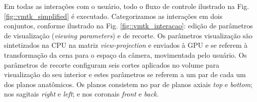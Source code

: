 \begin{figure}[ht]
 \end{figure}
 
 Em todas as interações com o usuário, todo o fluxo de controle ilustrado na Fig. \ref{fig::vmtk_simplified} é executado. Categorizamos as interações em dois conjuntos, conforme ilustrado na Fig. \ref{fig::vmtk_interacao}: edição de parâmetros de visualização (\textit{viewing parameters}) e de recorte. Os parâmetros visualização são sintetizados na CPU na matriz \textit{view-projection} e enviados à GPU e se referem à transformação da cena para o espaço da câmera, movimentada pelo usuário. Os parâmetros de recorte configuram seis cortes aplicados no volume para visualização do seu interior e estes parâmetros se referem a um par de cada um dos planos anatômicos. Os planos consistem no par de planos axiais \textit{top} e \textit{bottom}; nos sagitais \textit{right} e \textit{left}; e nos coronais \textit{front} e \textit{back}.%
 
